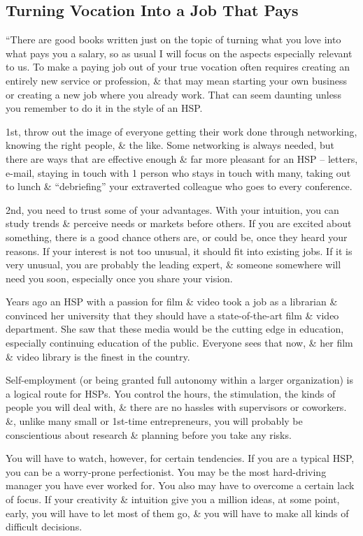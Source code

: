 \documentclass{article}
\numberwithin{equation}{section}
\begin{document}
\subsection{Turning Vocation Into a Job That Pays}
``There are good books written just on the topic of turning what you love into what pays you a salary, so as usual I will focus on the aspects especially relevant to us. To make a paying job out of your true vocation often requires creating an entirely new service or profession, \& that may mean starting your own business or creating a new job where you already work. That can seem daunting unless you remember to do it in the style of an HSP.

1st, throw out the image of everyone getting their work done through networking, knowing the right people, \& the like. Some networking is always needed, but there are ways that are effective enough \& far more pleasant for an HSP -- letters, e-mail, staying in touch with 1 person who stays in touch with many, taking out to lunch \& ``debriefing'' your extraverted colleague who goes to every conference.

2nd, you need to trust some of your advantages. With your intuition, you can study trends \& perceive needs or markets before others. If you are excited about something, there is a good chance others are, or could be, once they heard your reasons. If your interest is not too unusual, it should fit into existing jobs. If it is very unusual, you are probably the leading expert, \& someone somewhere will need you soon, especially once you share your vision.

Years ago an HSP with a passion for film \& video took a job as a librarian \& convinced her university that they should have a state-of-the-art film \& video department. She saw that these media would be the cutting edge in education, especially continuing education of the public. Everyone sees that now, \& her film \& video library is the finest in the country.

Self-employment (or being granted full autonomy within a larger organization) is a logical route for HSPs. You control the hours, the stimulation, the kinds of people you will deal with, \& there are no hassles with supervisors or coworkers. \&, unlike many small or 1st-time entrepreneurs, you will probably be conscientious about research \& planning before you take any risks.

You will have to watch, however, for certain tendencies. If you are a typical HSP, you can be a worry-prone perfectionist. You may be the most hard-driving manager you have ever worked for. You also may have to overcome a certain lack of focus. If your creativity \& intuition give you a million ideas, at some point, early, you will have to let most of them go, \& you will have to make all kinds of difficult decisions.
\end{document}
